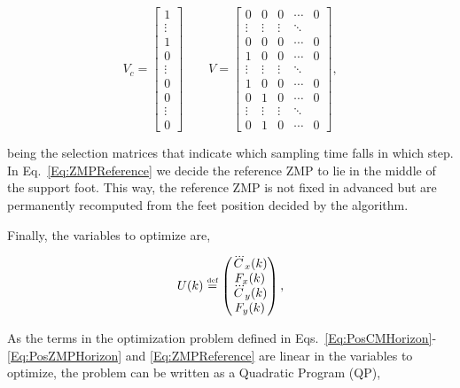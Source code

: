 \begin{equation*}
   V_c = \begin{bmatrix}1 \\ \vdots \\ 1 \\ 0 \\ \vdots \\ 0 \\ 0 \\ \vdots \\ 0  \end{bmatrix} \qquad
   V = \begin{bmatrix} 0 & 0 & 0 & \cdots & 0 \\ \vdots & \vdots
     & \vdots & \ddots\\ 
                                           0 & 0 & 0 & \cdots & 0\\
                           1 & 0 & 0 & \cdots & 0 \\ \vdots & \vdots &
                           \vdots &
                           \ddots \\ 1 & 0 & 0 &\cdots &0\\
                           0 & 1 & 0 & \cdots & 0\\ \vdots & \vdots &
                           \vdots & \ddots \\ 0 & 1 & 0 & \cdots &0\end{bmatrix},
\end{equation*}

being the selection matrices that indicate which sampling time falls in which step. In Eq.~\ref{Eq:ZMPReference} we decide the reference ZMP to lie in the middle of the support foot. This way, the reference ZMP is not fixed in advanced but are permanently recomputed from the feet position decided by the algorithm.

Finally, the variables to optimize are,

$$
U(k) \stackrel{\mbox{\tiny def}}{=} 
\left(
\begin{matrix}
\dddot{C}_{x}(k) \\
F_x(k) \\
\dddot{C}_{y}(k) \\
F_y(k)
\end{matrix}
\right),
$$

As the terms in the optimization problem defined in Eqs.~\ref{Eq:PosCMHorizon}-\ref{Eq:PosZMPHorizon} and \ref{Eq:ZMPReference} are linear in the variables to optimize, the problem can be written as a Quadratic Program (QP),

